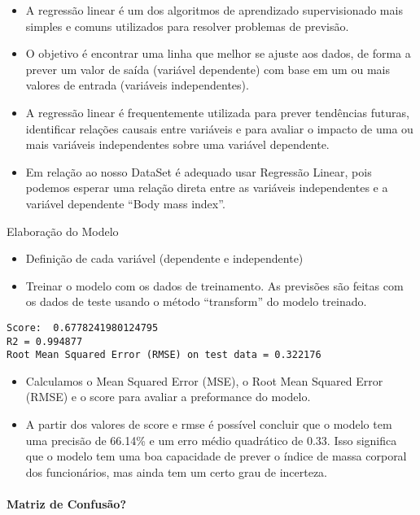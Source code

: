 \documentclass[11pt]{article}
\providecommand{\tightlist}{%
      \setlength{\itemsep}{0pt}\setlength{\parskip}{0pt}}
\begin{document}
    \begin{itemize}
\tightlist
\item
  A regressão linear é um dos algoritmos de aprendizado supervisionado
  mais simples e comuns utilizados para resolver problemas de previsão.
\item
  O objetivo é encontrar uma linha que melhor se ajuste aos dados, de
  forma a prever um valor de saída (variável dependente) com base em um
  ou mais valores de entrada (variáveis independentes).
\item
  A regressão linear é frequentemente utilizada para prever tendências
  futuras, identificar relações causais entre variáveis e para avaliar o
  impacto de uma ou mais variáveis independentes sobre uma variável
  dependente.
\item
  Em relação ao nosso DataSet é adequado usar Regressão Linear, pois
  podemos esperar uma relação direta entre as variáveis independentes e
  a variável dependente ``Body mass index''.
\end{itemize}
Elaboração do Modelo

    \begin{itemize}
\tightlist
\item
  Definição de cada variável (dependente e independente)
\item
  Treinar o modelo com os dados de treinamento. As previsões são feitas
  com os dados de teste usando o método ``transform'' do modelo
  treinado.
\end{itemize}


    \begin{Verbatim}[commandchars=\\\{\}]
Score:  0.6778241980124795
R2 = 0.994877
Root Mean Squared Error (RMSE) on test data = 0.322176
    \end{Verbatim}

    \begin{itemize}
\tightlist
\item
  Calculamos o Mean Squared Error (MSE), o Root Mean Squared Error
  (RMSE) e o score para avaliar a preformance do modelo.
\item
  A partir dos valores de score e rmse é possível concluir que o modelo
  tem uma precisão de 66.14\% e um erro médio quadrático de 0.33. Isso
  significa que o modelo tem uma boa capacidade de prever o índice de
  massa corporal dos funcionários, mas ainda tem um certo grau de
  incerteza.
\end{itemize}

    \hypertarget{matriz-de-confusuxe3o}{%
\paragraph{Matriz de Confusão?}\label{matriz-de-confusuxe3o}}
\end{document}
